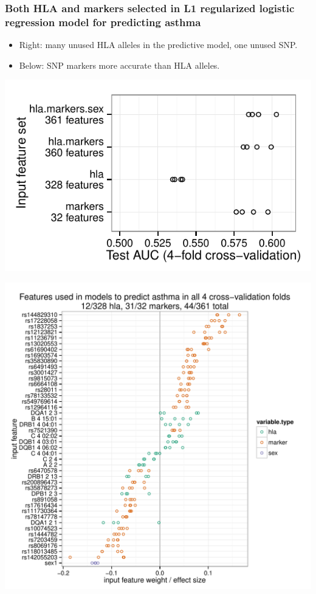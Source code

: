 \documentclass{beamer}
\begin{document}
\begin{frame}
  \frametitle{Both HLA and markers selected in L1 regularized logistic regression
    model for predicting asthma }

  \begin{minipage}{0.39\linewidth}
    \begin{itemize}
    \item Right: many unused HLA alleles in the predictive model, one
      unused SNP.
    \item Below: SNP markers more accurate than HLA alleles.
    \end{itemize}
    \includegraphics[width=\textwidth]{figure-asthma-old}
  \end{minipage}
  \begin{minipage}{0.59\linewidth}
    \includegraphics[width=\textwidth]{figure-asthma-4folds}
  \end{minipage}
\end{frame}
 
\end{document}
